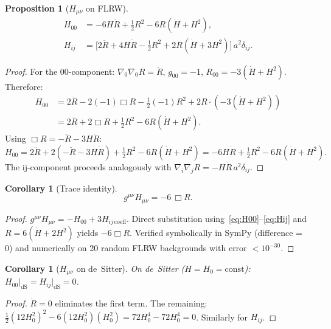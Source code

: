\documentclass[11pt,a4paper]{article}
\theoremstyle{plain}
\newtheorem{proposition}[theorem]{Proposition}
\newtheorem{corollary}[theorem]{Corollary}
\theoremstyle{definition}
\begin{document}
\begin{proposition}[$H_{\mu\nu}$ on FLRW]\label{prop:H-flrw}
\begin{align}
  H_{00} &= -6H\dot{R} + \tfrac{1}{2}R^2 - 6R(\dot{H} + H^2),
  \label{eq:H00}\\
  H_{ij} &= \bigl[2\ddot{R} + 4H\dot{R} - \tfrac{1}{2}R^2
    + 2R(\dot{H} + 3H^2)\bigr]\,a^2\delta_{ij}.
  \label{eq:Hij}
\end{align}
\end{proposition}

\begin{proof}
For the 00-component:
$\nabla_0\nabla_0 R = \ddot{R}$,
$g_{00} = -1$, $R_{00} = -3(\dot{H} + H^2)$.
Therefore:
\begin{align*}
  H_{00} &= 2\ddot{R} - 2(-1)\Box R - \tfrac{1}{2}(-1)R^2
  + 2R\cdot(-3(\dot{H}+H^2)) \\
  &= 2\ddot{R} + 2\Box R + \tfrac{1}{2}R^2 - 6R(\dot{H}+H^2).
\end{align*}
Using $\Box R = -\ddot{R} - 3H\dot{R}$:
\[
  H_{00} = 2\ddot{R} + 2(-\ddot{R} - 3H\dot{R}) + \tfrac{1}{2}R^2
  - 6R(\dot{H}+H^2)
  = -6H\dot{R} + \tfrac{1}{2}R^2 - 6R(\dot{H}+H^2).
\]
The ij-component proceeds analogously with
$\nabla_i\nabla_j R = -H\dot{R}\,a^2\delta_{ij}$.
\end{proof}

\begin{corollary}[Trace identity]\label{cor:trace}
\begin{equation}\label{eq:trace-H}
  g^{\mu\nu}H_{\mu\nu} = -6\,\Box R.
\end{equation}
\end{corollary}

\begin{proof}
$g^{\mu\nu}H_{\mu\nu} = -H_{00} + 3H_{ij\,\text{coeff}}$.
Direct substitution using~\eqref{eq:H00}--\eqref{eq:Hij} and
$R = 6(\dot{H}+2H^2)$ yields $-6\Box R$. Verified symbolically
in SymPy (difference = 0) and numerically on 20 random FLRW backgrounds
with error $< 10^{-30}$.
\end{proof}

\begin{corollary}[$H_{\mu\nu}$ on de~Sitter]\label{cor:H-dS}
On de~Sitter ($H = H_0 = \mathrm{const}$):
$H_{00}\big|_{\mathrm{dS}} = H_{ij}\big|_{\mathrm{dS}} = 0$.
\end{corollary}

\begin{proof}
$\dot{R} = 0$ eliminates the first term. The remaining:
$\frac{1}{2}(12H_0^2)^2 - 6(12H_0^2)(H_0^2)
= 72H_0^4 - 72H_0^4 = 0$.
Similarly for $H_{ij}$.
\end{proof}
\end{document}
